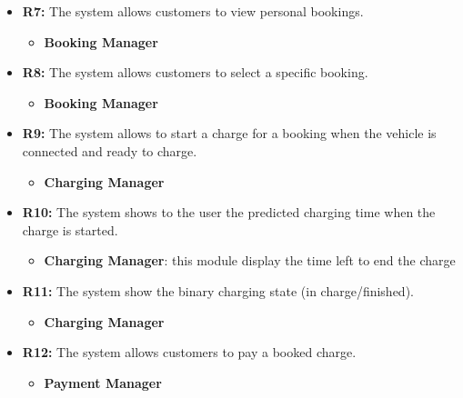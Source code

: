 \begin{itemize}
\begin{itemize}
          \end{itemize}
    \item \textbf{R7:} The system allows customers to view personal bookings.
          \begin{itemize}
              \item \textbf{Booking Manager}
          \end{itemize}
    \item \textbf{R8:} The system allows customers to select a specific booking.
          \begin{itemize}
              \item \textbf{Booking Manager}
          \end{itemize}
    \item \textbf{R9:} The system allows to start a charge for a booking when the vehicle is connected and ready to charge.
          \begin{itemize}
              \item \textbf{Charging Manager}
              
          \end{itemize}


    \item \textbf{R10:} The system shows to the user the predicted charging time when the charge is started.
          \begin{itemize}
              \item \textbf{Charging Manager}: this module display the time left to end the charge
          \end{itemize}
    \item \textbf{R11:} The system show the binary charging state (in charge/finished).
          \begin{itemize}
              \item \textbf{Charging Manager}
          \end{itemize}


          
          \item \textbf{R12:} The system allows customers to pay a booked charge.
          \begin{itemize}
              \item \textbf{Payment Manager}
              

\end{itemize}
\end{itemize}
